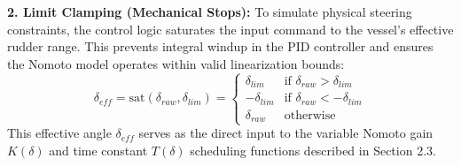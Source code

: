 \documentclass[12pt, a4paper, oneside]{report}
\begin{document}
\textbf{2. Limit Clamping (Mechanical Stops):}
To simulate physical steering constraints, the control logic saturates the input command to the vessel's effective rudder range. This prevents integral windup in the PID controller and ensures the Nomoto model operates within valid linearization bounds:
\begin{equation}
    \delta_{eff} = \text{sat}(\delta_{raw}, \delta_{lim}) = \begin{cases} 
      \delta_{lim} & \text{if } \delta_{raw} > \delta_{lim} \\
      -\delta_{lim} & \text{if } \delta_{raw} < -\delta_{lim} \\
      \delta_{raw} & \text{otherwise}
   \end{cases}
\end{equation}
This effective angle $\delta_{eff}$ serves as the direct input to the variable Nomoto gain $K(\delta)$ and time constant $T(\delta)$ scheduling functions described in Section 2.3.
\end{document}
